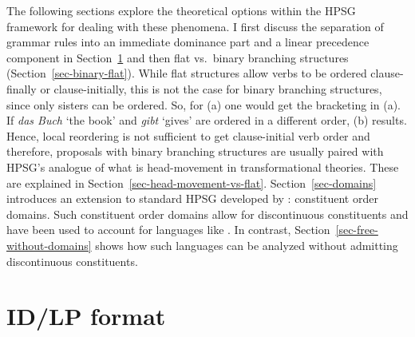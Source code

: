 \documentclass[output=paper,biblatex,babelshorthands,newtxmath,draftmode,colorlinks,citecolor=brown]{langscibook}
\begin{document}
The following sections explore the theoretical options within the HPSG framework for dealing with
these phenomena. I first discuss the separation of grammar rules into an immediate dominance part and
a linear precedence component in Section~\ref{sec-id-lp} and then flat vs.\ binary branching
structures (Section~\ref{sec-binary-flat}). While flat structures allow verbs to be ordered clause-finally
or clause-initially, this is not the case for binary branching structures, since only sisters can be
ordered. So, for (a) one would get the bracketing in (a). If \emph{das Buch} `the
book' and \emph{gibt} `gives' are ordered in a different order, (b) results.
\eal
{}
\zl
Hence, local reordering is not sufficient to get clause-initial verb order and therefore, proposals with binary branching
structures are usually paired with HPSG's analogue of what is head-movement in transformational
theories. These are explained in Section~\ref{sec-head-movement-vs-flat}. Section~\ref{sec-domains} introduces an extension to
standard HPSG developed by \citet{Reape94a}: constituent order domains. Such constituent
order domains allow for discontinuous constituents and have been used to account for languages like 
\citep{DS99a}. In contrast, Section~\ref{sec-free-without-domains} shows how such languages can be analyzed without admitting discontinuous constituents.


\section{ID/LP format}
\label{sec-id-lp}
\end{document}
